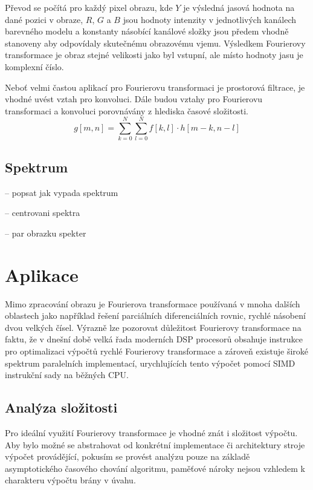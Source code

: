 \documentclass[11pt,a4paper]{article}
\begin{document}
Převod se počítá pro každý pixel obrazu, kde $Y$ je výsledná jasová hodnota na dané pozici v obraze,
$R$, $G$ a $B$ jsou hodnoty intenzity v jednotlivých kanálech barevného modelu a konstanty násobící
kanálové složky jsou předem vhodně stanoveny aby odpovídaly skutečnému obrazovému vjemu.
Výsledkem Fourierovy transformace je obraz stejné velikosti jako byl vstupní, ale místo hodnoty jasu
je komplexní číslo.

Neboť velmi častou aplikací pro Fourierovu transformaci je prostorová filtrace, je vhodné uvést vztah 
pro konvoluci. Dále budou vztahy pro Fourierovu transformaci a konvoluci porovnávány z hlediska 
časové složitosti.
\begin{equation}
g[m,n] = \sum_{k=0}^{N}{\sum_{l=0}^{N}{f[k,l]\cdot h[m-k, n-l]}}
\label{konvoluce}
\end{equation}

\subsection{Spektrum}
-- popsat jak vypada spektrum

-- centrovani spektra

-- par obrazku spekter

\section{Aplikace}
Mimo zpracování obrazu je Fourierova transformace používaná v mnoha dalších oblastech jako například
řešení parciálních diferenciálních rovnic, rychlé násobení dvou velkých čísel. Výrazně lze pozorovat
důležitost Fourierovy transformace na faktu, že v dnešní době velká řada moderních DSP procesorů obsahuje
instrukce pro optimalizaci výpočtů rychlé Fourierovy transformace a zároveň existuje široké spektrum
paralelních implementací, urychlujících tento výpočet pomocí SIMD instrukční sady na běžných CPU.

\subsection{Analýza složitosti}
Pro ideální využití Fourierovy transformace je vhodné znát i složitost výpočtu. Aby bylo  možné se
abstrahovat od konkrétní implementace či architektury stroje výpočet provádějící, 
pokusím se provést analýzu pouze na základě asymptotického časového chování algoritmu, paměťové
nároky nejsou vzhledem k charakteru výpočtu brány v úvahu.
\end{document}
